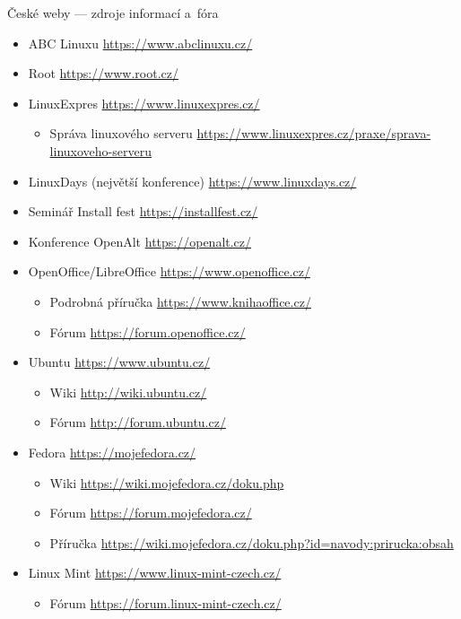 \documentclass[compress, ucs, xelatex, 11pt, xcolor=svgnames, aspectratio=169,
	hyperref={
		bookmarks=true,
		unicode=true,
		colorlinks=true,
		pdftitle={Linux, command line and MetaCentrum},
		plainpages=false,
		pdfauthor={Vojtech Zeisek},
		pdfsubject={Course about use of Linux command line, writing shell scripts and using MetaCentrum of CESNET},
		pdfcreator={XeLaTeX},
		pdfkeywords={Linux, GNU, BASH, shell, command line, MetaCentrum},
		linkcolor=DarkRed, %
		anchorcolor=DarkBlue, %
		citecolor=Indigo, %
		filecolor=NavyBlue, %
		menucolor=DarkMagenta, %
		urlcolor=DarkBlue, %
		pdftex},
	url={hyphens, lowtilde} %
	]{beamer}
\begin{document}
\begin{frame}[allowframebreaks]{České weby --- zdroje informací a~fóra}
	\begin{itemize}
		\item ABC Linuxu \url{https://www.abclinuxu.cz/}
		\item Root \url{https://www.root.cz/}
		\item LinuxExpres \url{https://www.linuxexpres.cz/}
		\begin{itemize}
			\item Správa linuxového serveru \url{https://www.linuxexpres.cz/praxe/sprava-linuxoveho-serveru}
		\end{itemize}
		\item LinuxDays (největší konference) \url{https://www.linuxdays.cz/}
		\item Seminář Install fest \url{https://installfest.cz/}
		\item Konference OpenAlt \url{https://openalt.cz/}
		\item OpenOffice/LibreOffice \url{https://www.openoffice.cz/}
		\begin{itemize}
			\item Podrobná příručka \url{https://www.knihaoffice.cz/}
			\item Fórum \url{https://forum.openoffice.cz/}
		\end{itemize}
		\item Ubuntu \url{https://www.ubuntu.cz/}
		\begin{itemize}
			\item Wiki \url{http://wiki.ubuntu.cz/}
			\item Fórum \url{http://forum.ubuntu.cz/}
		\end{itemize}
		\item Fedora \url{https://mojefedora.cz/}
		\begin{itemize}
			\item Wiki \url{https://wiki.mojefedora.cz/doku.php}
			\item Fórum \url{https://forum.mojefedora.cz/}
			\item Příručka \url{https://wiki.mojefedora.cz/doku.php?id=navody:prirucka:obsah}
		\end{itemize}
		\item Linux Mint \url{https://www.linux-mint-czech.cz/}
		\begin{itemize}
			\item Fórum \url{https://forum.linux-mint-czech.cz/}
		\end{itemize}
	\end{itemize}
\end{frame}
\end{document}
